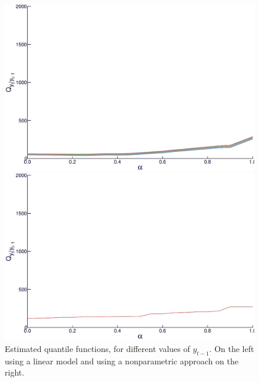 \begin{figure}
  \centering
  \begin{minipage}[t]{\linewidth}
    \centering
    \begin{minipage}[t]{0.45\linewidth}
      \centering     \includegraphics[width=\textwidth]{Figuras/regressao-quantilica/quantile-linear}
    \end{minipage}
    \begin{minipage}[t]{0.45\linewidth}
      \centering     \includegraphics[width=\textwidth]{Figuras/regressao-quantilica/quantile-nonpar}
    \end{minipage}
  \end{minipage}
  \caption{Estimated quantile functions, for different values of $y_{t-1}$. On the left using a linear model and using a nonparametric approach on the right.}
  \label{fig:scatterplot-alphaquantiles}
\end{figure}
